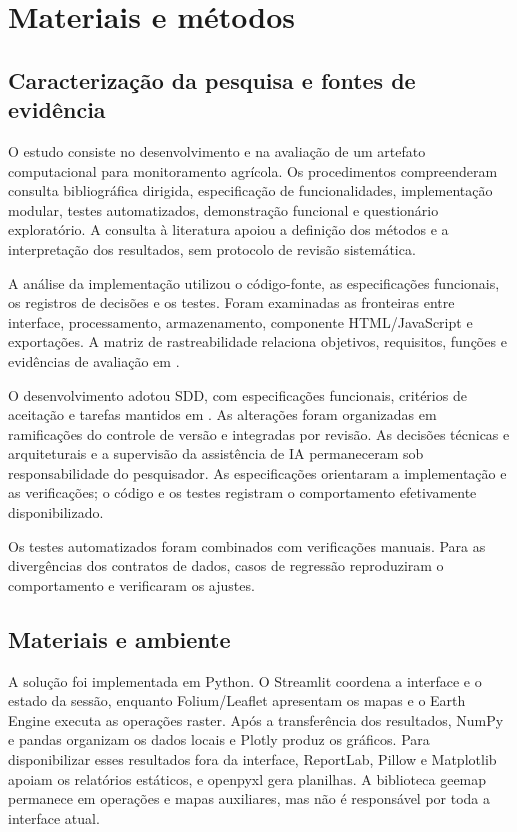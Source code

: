 \newpage
\section{Materiais e métodos}\label{chap:metodos-final}

\subsection{Caracterização da pesquisa e fontes de evidência}

O estudo consiste no desenvolvimento e na avaliação de um artefato computacional para monitoramento agrícola. Os procedimentos compreenderam consulta bibliográfica dirigida, especificação de funcionalidades, implementação modular, testes automatizados, demonstração funcional e questionário exploratório. A consulta à literatura apoiou a definição dos métodos e a interpretação dos resultados, sem protocolo de revisão sistemática.

A análise da implementação utilizou o código-fonte, as especificações funcionais, os registros de decisões e os testes. Foram examinadas as fronteiras entre interface, processamento, armazenamento, componente HTML/JavaScript e exportações. A matriz de rastreabilidade relaciona objetivos, requisitos, funções e evidências de avaliação em .

O desenvolvimento adotou SDD, com especificações funcionais, critérios de aceitação e tarefas mantidos em . As alterações foram organizadas em ramificações do controle de versão e integradas por revisão. As decisões técnicas e arquiteturais e a supervisão da assistência de IA permaneceram sob responsabilidade do pesquisador. As especificações orientaram a implementação e as verificações; o código e os testes registram o comportamento efetivamente disponibilizado.

Os testes automatizados foram combinados com verificações manuais. Para as divergências dos contratos de dados, casos de regressão reproduziram o comportamento e verificaram os ajustes.

\subsection{Materiais e ambiente}

A solução foi implementada em Python. O Streamlit coordena a interface e o estado da sessão, enquanto Folium/Leaflet apresentam os mapas e o Earth Engine executa as operações raster. Após a transferência dos resultados, NumPy e pandas organizam os dados locais e Plotly produz os gráficos. Para disponibilizar esses resultados fora da interface, ReportLab, Pillow e Matplotlib apoiam os relatórios estáticos, e openpyxl gera planilhas. A biblioteca geemap permanece em operações e mapas auxiliares, mas não é responsável por toda a interface atual.

